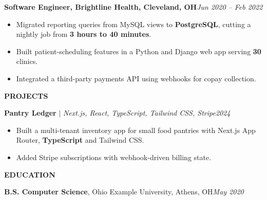\documentclass[letterpaper,10.5pt]{article}
\newcommand{\resSection}[1]{%
  \vspace{5pt}%
  {\color{accent}\large\bfseries\MakeUppercase{#1}}%
  \hspace{6pt}{\color{accent}\leaders\hrule height 0.7pt\hfill\kern0pt}\par
  \vspace{3pt}}
\newcommand{\resRole}[4]{%
  \vspace{3pt}%
  {\small\textbf{\color{accent}#1}\textbf{, #2, #3}\hfill\textit{#4}}\par
  \vspace{1pt}}
\newcommand{\resProject}[3]{%
  \vspace{3pt}%
  {\small\textbf{\color{accent}#1} $|$ \textit{#2}\hfill\textit{#3}}\par
  \vspace{1pt}}
\newenvironment{resBullets}
  {\begin{itemize}[leftmargin=0.32in, itemsep=1pt, parsep=0pt, topsep=1pt, label={\tiny\raisebox{1.5pt}{$\bullet$}}]\small}
  {\end{itemize}}
\begin{document}
\resRole{Software Engineer}{Brightline Health}{Cleveland, OH}{Jun 2020 -- Feb 2022} %
\begin{resBullets}
  \item Migrated reporting queries from MySQL views to \textbf{PostgreSQL}, cutting a nightly job from \textbf{3 hours to 40 minutes}. %
  \item Built patient-scheduling features in a Python and Django web app serving \textbf{30} clinics. %
  \item Integrated a third-party payments API using webhooks for copay collection. %
\end{resBullets}

\resSection{Projects}
\resProject{Pantry Ledger}{Next.js, React, TypeScript, Tailwind CSS, Stripe}{2024} %
\begin{resBullets}
  \item Built a multi-tenant inventory app for small food pantries with Next.js App Router, \textbf{TypeScript} and Tailwind CSS. %
  \item Added Stripe subscriptions with webhook-driven billing state. %
\end{resBullets}

\resSection{Education}
{\small\textbf{B.S. Computer Science}, Ohio Example University, Athens, OH\hfill\textit{May 2020}\par} %
\end{document}
